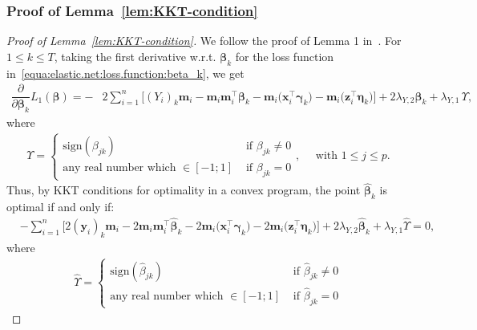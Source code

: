 \documentclass[
  12pt]{article}
\def\M{\mathbf{m}}
\def\X{\mathbf{x}}
\def\Y{\mathbf{y}}
\def\Z{\mathbf{z}}
\begin{document}
\subsubsection{Proof of Lemma~\ref{lem:KKT-condition}}
%
\label{section:proof:lem:KKT-condition}
\begin{proof}[Proof of Lemma~\ref{lem:KKT-condition}]
We follow the proof of Lemma 1 in~\cite{Jia-Yu:2010:model.consistency.elastic-net}. 
For $1 \leq k \leq T$,  taking the first derivative w.r.t. $\bm{\beta}_{k}$ for the loss function in~\eqref{equa:elastic.net:loss.function:beta_k}, we get   
	\begin{align*}
		\dfrac{\partial}{\partial \bm{\beta}_{k}} L_{1}(\bm{\beta})   
		= -  &2 \sum_{i=1}^{n} \Big[  (Y_{i})_{k} \M_{i} -   \M_{i}  \M_{i}^{\top}  \bm{\beta}_{k} -  \M_{i} \big( \X_{i}^{\top} \bm{\gamma}_{k} \big) - \M_{i} \big(  \Z_{i}^{\top} \bm{\eta}_{k} \big) \Big] 
		+ 2 \lambda_{Y,2}   \bm{\beta}_{k} + \lambda_{Y,1}    
		\,  \Upsilon ,  
	\end{align*}
	where 
	\begin{align*}
		\Upsilon =  \left\{  \begin{array}{ll}
			\textrm{sign}(\beta_{jk})	&  \textrm{ if }  \beta_{jk}  \neq  0
			\\[0.2cm]   
			\textrm{any real number which } \in [-1 ; 1] 	&  \textrm{ if }  \beta_{jk}  =  0
		\end{array}
		\right. , \quad  \textrm{  with  }  1  \leq  j  \leq  p .   
	\end{align*} 
	Thus, by KKT conditions for optimality in a convex program, the point $\widehat{\bm{\beta}}_{k}$ is optimal if and only if:
	\begin{align}
		& -  \sum_{i=1}^{n} \Big[ 2 (\Y_{i})_{k} \M_{i}  -   2 \M_{i} \M_{i}^{\top}  \widehat{\bm{\beta}}_{k}  - 2 \M_{i} \big( \X_{i}^{\top} \bm{\gamma}_{k} \big) - 2 \M_{i} \big(   \Z_{i}^{\top}\bm{\eta}_{k} \big) \Big] 
		+ 2 \lambda_{Y,2}   \widehat{\bm{\beta}}_{k} + \lambda_{Y,1}   \widehat{ \Upsilon }   
		=  0,    
	\end{align} 
	where 
	\begin{align*}
		\widehat{ \Upsilon }   =  \left\{  \begin{array}{ll}
			\textrm{sign}(\widehat{\beta}_{jk})	&  \textrm{ if }  \widehat{\beta}_{jk}  \neq  0
			\\[0.2cm]   
			\textrm{any real number which } \in [-1 ; 1] 	&  \textrm{ if }  \widehat{\beta}_{jk}  =  0

\end{array}
\end{align*}
\end{proof}
\end{document}
